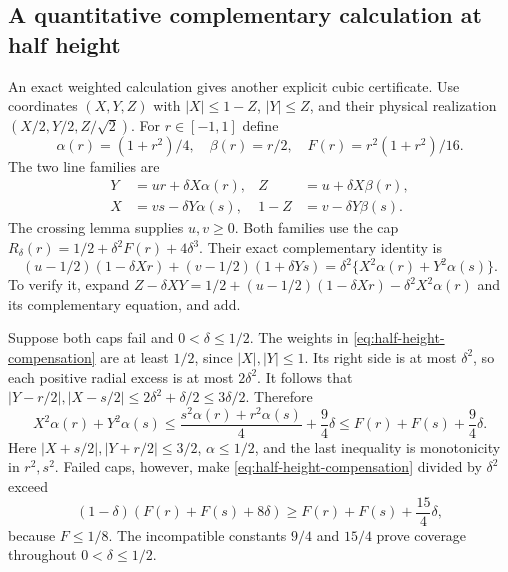 \subsection{A quantitative complementary calculation at half height}

An exact weighted calculation gives another explicit cubic certificate.
Use coordinates $(X,Y,Z)$ with
$|X|\le1-Z$, $|Y|\le Z$, and their physical realization
$(X/2,Y/2,Z/\sqrt2)$. For $r\in[-1,1]$ define
\[
 \alpha(r)=(1+r^2)/4,\quad \beta(r)=r/2,\quad
 F(r)=r^2(1+r^2)/16.
\]
The two line families are
\begin{align*}
 Y&=ur+\delta X\alpha(r),& Z&=u+\delta X\beta(r),\\
 X&=vs-\delta Y\alpha(s),&1-Z&=v-\delta Y\beta(s).
\end{align*}
The crossing lemma supplies $u,v\ge0$. Both families use the cap
$R_\delta(r)=1/2+\delta^2F(r)+4\delta^3$.
Their exact complementary identity is
\begin{equation}\label{eq:half-height-compensation}
 (u-1/2)(1-\delta Xr)+(v-1/2)(1+\delta Ys)
 =\delta^2\{X^2\alpha(r)+Y^2\alpha(s)\}.
\end{equation}
To verify it, expand
$Z-\delta XY=1/2+(u-1/2)(1-\delta Xr)-\delta^2X^2\alpha(r)$
and its complementary equation, and add.

Suppose both caps fail and $0<\delta\le1/2$. The weights in
\eqref{eq:half-height-compensation} are at least $1/2$, since
$|X|,|Y|\le1$. Its right side is at most $\delta^2$, so each
positive radial excess is at most $2\delta^2$. It follows that
$|Y-r/2|,|X-s/2|\le2\delta^2+\delta/2\le3\delta/2$. Therefore
\[
 X^2\alpha(r)+Y^2\alpha(s)
 \le\frac{s^2\alpha(r)+r^2\alpha(s)}4+\frac94\delta
 \le F(r)+F(s)+\frac94\delta.
\]
Here $|X+s/2|,|Y+r/2|\le3/2$, $\alpha\le1/2$, and the last
inequality is monotonicity in $r^2,s^2$. Failed caps, however, make
\eqref{eq:half-height-compensation} divided by $\delta^2$ exceed
\[
 (1-\delta)(F(r)+F(s)+8\delta)
 \ge F(r)+F(s)+\frac{15}{4}\delta,
\]
because $F\le1/8$. The incompatible constants $9/4$ and $15/4$
prove coverage throughout $0<\delta\le1/2$.

